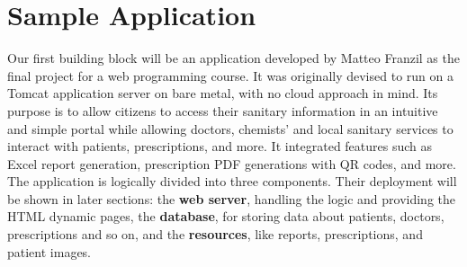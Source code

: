 \section{Sample Application}
\label{cha:sampleapp}
Our first building block will be an application developed by Matteo Franzil as the final project for a web programming course. It was originally devised to run on a Tomcat application server on bare metal, with no cloud approach in mind. 
\newline
Its purpose is to allow citizens to access their sanitary information in an intuitive and simple portal while allowing doctors, chemists' and local sanitary services to interact with patients, prescriptions, and more. It integrated features such as Excel report generation, prescription PDF generations with QR codes, and more.
\newline
The application is logically divided into three components. Their deployment will be shown in later sections: the \textbf{web server}, handling the logic and providing the HTML dynamic pages, the \textbf{database}, for storing data about patients, doctors, prescriptions and so on, and the \textbf{resources}, like reports, prescriptions, and patient images.
